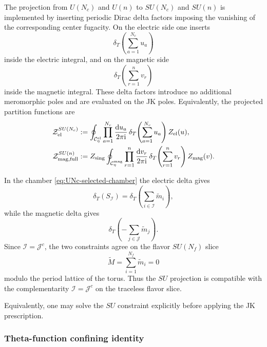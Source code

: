 \documentclass[11pt,a4paper]{article}
\numberwithin{equation}{section}
\theoremstyle{plain}
\theoremstyle{definition}
\theoremstyle{remark}
\newcommand{\ii}{\mathrm{i}}
\newcommand{\dd}{\mathrm{d}}
\newcommand{\nn}{\nonumber}
\begin{document}
The projection from \(U(N_c)\) and \(U(n)\) to \(SU(N_c)\) and \(SU(n)\) is implemented by inserting periodic Dirac delta factors imposing the vanishing of the corresponding center fugacity. On the electric side one inserts
\begin{equation}
\delta_T\!\left(\sum_{a=1}^{N_c}u_a\right)
\end{equation}
inside the electric integral, and on the magnetic side
\begin{equation}
\delta_T\!\left(\sum_{r=1}^{n}v_r\right)
\end{equation}
inside the magnetic integral. These delta factors introduce no additional meromorphic poles and are evaluated on the JK poles.  Equivalently, the projected partition functions are
\begin{align}
\mathcal Z_{\rm el}^{SU(N_c)}
&:=
\oint_{\mathcal C_\eta^{\rm el}}
\prod_{a=1}^{N_c}\frac{\dd u_a}{2\pi\ii}\,
\delta_T\!\left(\sum_{a=1}^{N_c}u_a\right)Z_{\rm el}(u),
\nn\\
\mathcal Z_{\rm mag,full}^{SU(n)}
&:=
Z_{\rm sing}
\oint_{\mathcal C_\eta^{\rm mag}}
\prod_{r=1}^{n}\frac{\dd v_r}{2\pi\ii}\,
\delta_T\!\left(\sum_{r=1}^{n}v_r\right)Z_{\rm mag}(v).
\label{eq:SU-projected-partition-functions}
\end{align}

In the chamber \eqref{eq:UNc-selected-chamber} the electric delta gives
\begin{equation}
\delta_T(S_{\mathcal I})
=
\delta_T\!\left(\sum_{i\in\mathcal I}\widetilde m_i\right),
\end{equation}
while the magnetic delta gives
\begin{equation}
\delta_T\!\left(-\sum_{j\in\mathcal J}\widetilde m_j\right).
\end{equation}
Since \(\mathcal I=\mathcal J^c\), the two constraints agree on the flavor \(SU(N_f)\) slice
\begin{equation}
\widetilde M=\sum_{i=1}^{N_f}\widetilde m_i=0
\end{equation}
modulo the period lattice of the torus. Thus the \(SU\) projection is compatible with the complementarity \(\mathcal I=\mathcal J^c\) on the traceless flavor slice.

Equivalently, one may solve the \(SU\) constraint explicitly before applying the JK prescription.



\subsubsection{Theta-function confining identity}
\label{subsubsec:theta-U0-identity}
\end{document}
